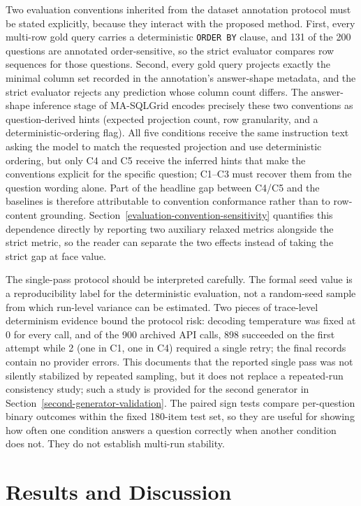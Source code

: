 \documentclass{article}
\begin{document}
Two evaluation conventions inherited from the dataset annotation protocol must be stated explicitly, because they interact with the proposed method. First, every multi-row gold query carries a deterministic \texttt{ORDER BY} clause, and 131 of the 200 questions are annotated order-sensitive, so the strict evaluator compares row sequences for those questions. Second, every gold query projects exactly the minimal column set recorded in the annotation's answer-shape metadata, and the strict evaluator rejects any prediction whose column count differs. The answer-shape inference stage of MA-SQLGrid encodes precisely these two conventions as question-derived hints (expected projection count, row granularity, and a deterministic-ordering flag). All five conditions receive the same instruction text asking the model to match the requested projection and use deterministic ordering, but only C4 and C5 receive the inferred hints that make the conventions explicit for the specific question; C1--C3 must recover them from the question wording alone. Part of the headline gap between C4/C5 and the baselines is therefore attributable to convention conformance rather than to row-content grounding. Section~\ref{evaluation-convention-sensitivity} quantifies this dependence directly by reporting two auxiliary relaxed metrics alongside the strict metric, so the reader can separate the two effects instead of taking the strict gap at face value.

The single-pass protocol should be interpreted carefully. The formal seed value is a reproducibility label for the deterministic evaluation, not a random-seed sample from which run-level variance can be estimated. Two pieces of trace-level determinism evidence bound the protocol risk: decoding temperature was fixed at 0 for every call, and of the 900 archived API calls, 898 succeeded on the first attempt while 2 (one in C1, one in C4) required a single retry; the final records contain no provider errors. This documents that the reported single pass was not silently stabilized by repeated sampling, but it does not replace a repeated-run consistency study; such a study is provided for the second generator in Section~\ref{second-generator-validation}. The paired sign tests compare per-question binary outcomes within the fixed 180-item test set, so they are useful for showing how often one condition answers a question correctly when another condition does not. They do not establish multi-run stability.

\section{Results and Discussion}\label{results}
\end{document}
